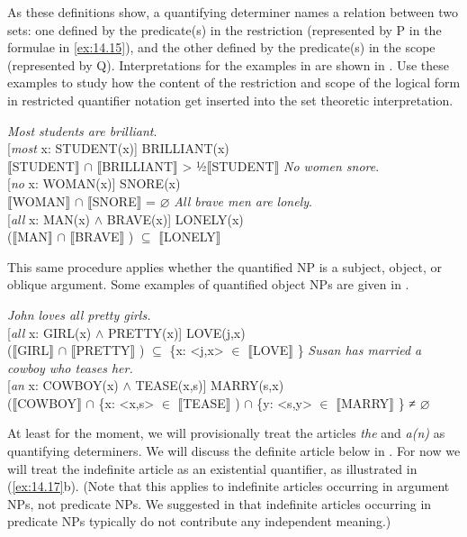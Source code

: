 As these definitions show, a quantifying determiner names a relation between two sets: one defined by the predicate(s) in the restriction (represented by P in the formulae in \ref{ex:14.15}), and the other defined by the predicate(s) in the scope (represented by Q). Interpretations for the examples in  are shown in . Use these examples to study how the content of the restriction and scope of the logical form in restricted quantifier notation get inserted into the set theoretic interpretation.


\ea \label{ex:14.16}
\ea  \textit{Most students are brilliant}.\\
{}[\textit{most} x: STUDENT(x)] BRILLIANT(x)\\
{\textbar} \textsc{$\llbracket$}STUDENT$\rrbracket$  ${\cap}$ \textsc{$\llbracket$}BRILLIANT$\rrbracket$  {\textbar}  >  ½\textsc{{\textbar}}\textsc{$\llbracket$}STUDENT$\rrbracket$ {\textbar}
\ex \textit{No women snore}.\\
{}[\textit{no} x: WOMAN(x)] SNORE(x)\\
\textsc{$\llbracket$}WOMAN$\rrbracket$  ${\cap}$ \textsc{$\llbracket$}SNORE$\rrbracket$  = ⌀
\ex   \textit{All brave men are lonely}.\\
{}[\textit{all} x: MAN(x) $\wedge$ BRAVE(x)] LONELY(x)\\
\textsc{($\llbracket$}MAN$\rrbracket$  ${\cap}$ \textsc{$\llbracket$}BRAVE$\rrbracket$ )  ${\subseteq}$ \textsc{$\llbracket$}LONELY$\rrbracket$ 
\z \z


This same procedure applies whether the quantified NP is a subject, object, or oblique argument. Some examples of quantified object NPs are given in .


\ea \label{ex:14.17}
\ea \textit{John loves all pretty girls.}\\
{}[\textit{all} x: GIRL(x) $\wedge$ PRETTY(x)] LOVE(j,x)\\
($\llbracket$GIRL$\rrbracket$  ${\cap}$ $\llbracket$PRETTY$\rrbracket$ ) ${\subseteq}$ \{x: <j,x> ${\in}$ $\llbracket$LOVE$\rrbracket$ \}
\ex \textit{Susan has married a cowboy who teases her.}\\
{}[\textit{an} x: COWBOY(x) $\wedge$ TEASE(x,s)] MARRY(s,x)\\
($\llbracket$COWBOY$\rrbracket$  ${\cap}$ \{x: <x,s> ${\in}$ $\llbracket$TEASE$\rrbracket$ ) ${\cap}$ \{y: <s,y> ${\in}$ $\llbracket$MARRY$\rrbracket$ \} ≠ ⌀
\z \z


At least for the moment, we will provisionally treat the articles \textit{the} and \textit{a(n)} as quantifying determiners. We will discuss the definite article below in . For now we will treat the indefinite article as an existential quantifier, as illustrated in (\ref{ex:14.17}b). (Note that this applies to indefinite articles occurring in argument NPs, not predicate NPs. We suggested in  that indefinite articles occurring in predicate NPs typically do not contribute any independent meaning.)



